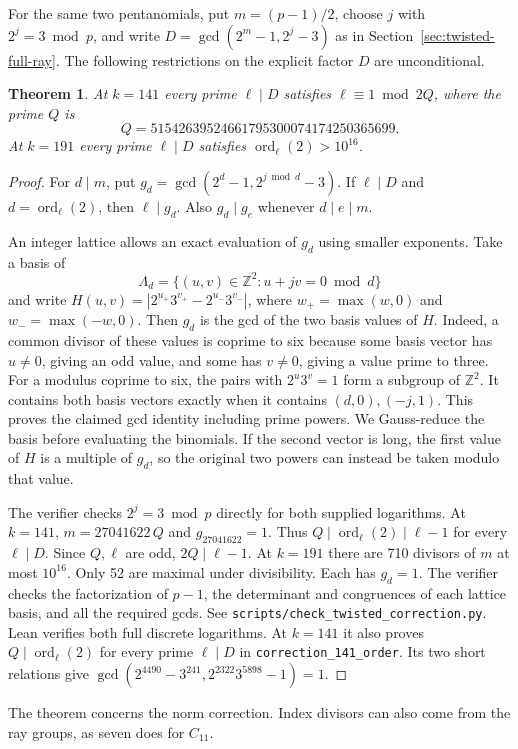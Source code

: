 \documentclass[11pt]{article}
\newtheorem{theorem}{Theorem}
\newcommand{\ord}{\operatorname{ord}}
\begin{document}
For the same two pentanomials, put \(m=(p-1)/2\), choose \(j\)
with \(2^j=3\bmod p\), and write \(D=\gcd(2^m-1,2^j-3)\) as in
Section~\ref{sec:twisted-full-ray}. The following restrictions
on the explicit factor \(D\) are unconditional.
\begin{theorem}
At \(k=141\) every prime \(\ell\mid D\) satisfies
\(\ell\equiv1\bmod 2Q\), where the prime \(Q\) is
\[
                  Q=51542639524661795300074174250365699.
\]
At \(k=191\) every prime \(\ell\mid D\) satisfies
\(\ord_\ell(2)>10^{16}\).
\end{theorem}
\begin{proof}
For \(d\mid m\), put \(g_d=\gcd(2^d-1,2^{j\bmod d}-3)\).
If \(\ell\mid D\) and \(d=\ord_\ell(2)\), then \(\ell\mid g_d\).
Also \(g_d\mid g_e\) whenever \(d\mid e\mid m\).

An integer lattice allows an exact evaluation of \(g_d\) using
smaller exponents. Take a basis of
\[
          \Lambda_d=\{(u,v)\in\mathbb Z^2:u+jv=0\bmod d\}
\]
and write \(H(u,v)=|2^{u_+}3^{v_+}-2^{u_-}3^{v_-}|\),
where \(w_+=\max(w,0)\) and \(w_-=\max(-w,0)\).
Then \(g_d\) is the gcd of the two basis values of \(H\).
Indeed, a common divisor of these values is coprime to six because
some basis vector has \(u\ne0\), giving an odd value, and some
has \(v\ne0\), giving a value prime to three. For a modulus
coprime to six, the pairs with \(2^u3^v=1\) form a subgroup
of \(\mathbb Z^2\). It contains both basis vectors exactly when
it contains \((d,0),(-j,1)\). This proves the claimed gcd identity
including prime powers. We Gauss-reduce the basis before evaluating
the binomials. If the second vector is long, the first value of \(H\)
is a multiple of \(g_d\), so the original two powers can instead
be taken modulo that value.

The verifier checks \(2^j=3\bmod p\) directly for both supplied
logarithms. At \(k=141\), \(m=27041622\,Q\) and \(g_{27041622}=1\).
Thus \(Q\mid\ord_\ell(2)\mid\ell-1\) for every \(\ell\mid D\).
Since \(Q,\ell\) are odd, \(2Q\mid\ell-1\). At \(k=191\) there
are 710 divisors of \(m\) at most \(10^{16}\). Only 52 are maximal
under divisibility. Each has \(g_d=1\). The verifier checks the
factorization of \(p-1\), the determinant and congruences of
each lattice basis, and all the required gcds. See
\nolinkurl{scripts/check_twisted_correction.py}.
Lean verifies both full discrete logarithms. At \(k=141\) it also
proves \(Q\mid\ord_\ell(2)\) for every prime \(\ell\mid D\)
in \texttt{correction\_141\_order}. Its two short relations give
\(\gcd(2^{4490}-3^{241},2^{2322}3^{5898}-1)=1\).
\end{proof}
The theorem concerns the norm correction. Index divisors can also
come from the ray groups, as seven does for \(C_{11}\).
\end{document}
